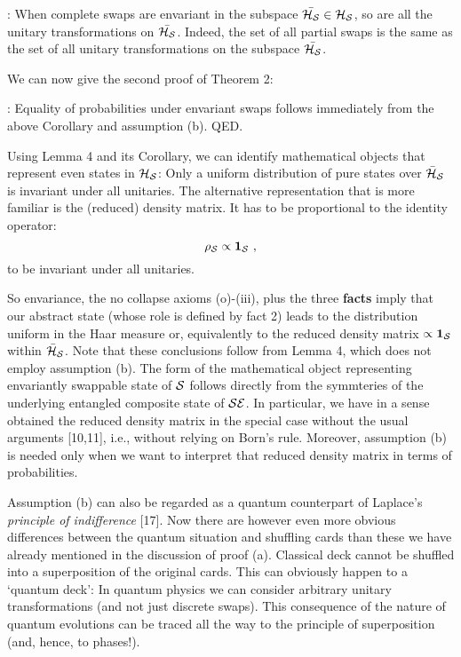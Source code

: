 \documentclass[aps,twocolumn,pra,epsfig]{revtex4}
\begin{document}
: When complete swaps are envariant in the subspace
$\bar {\cal H_S} \in {\cal H_S}$, so are all the unitary transformations on
$\bar {\cal H_S}$. Indeed, the set of all partial swaps is the same
as the set of all unitary transformations on the subspace $\bar {\cal H_S}$.

We can now give the second proof of Theorem 2:

: Equality of probabilities under envariant swaps
follows immediately from the above Corollary and assumption (b). QED.

Using Lemma 4 and its Corollary, we can identify mathematical objects that
represent even states in ${\cal H_S}$: Only a uniform  distribution of pure
states over $\bar {\cal H}_{\cal S}$ is invariant under all unitaries.
The alternative representation that is more familiar is the (reduced)
density matrix. It has to be proportional to the identity operator:
$$ \rho_{\cal S} \propto {\bf 1}_{\cal S} \ , $$
to be invariant under all unitaries.

So envariance, the no collapse axioms (o)-(iii), plus the three {\bf facts}
imply that our abstract state (whose role is defined by fact 2) leads to
the distribution uniform in the Haar measure or, equivalently to the reduced
density matrix $\propto{\bf 1}_{\cal S}$ within $\bar {\cal H}_{\cal S}$. Note
that these conclusions follow from Lemma 4, which does not employ assumption
(b). The form of the mathematical object representing envariantly swappable
state of ${\cal S}$ follows directly from the symmteries of the underlying
entangled composite state of ${\cal SE}$. In particular, we have in a sense
obtained the reduced density matrix in the special case without the usual
arguments [10,11], i.e., without relying on Born's rule. Moreover, assumption
(b) is needed only when we want to interpret that reduced density matrix
in terms of probabilities.

Assumption (b) can also be regarded as a quantum counterpart of
Laplace's {\it principle of indifference} [17]. Now there are however even
more obvious differences between the quantum situation and shuffling cards
than these we have already mentioned in the discussion of proof (a). Classical 
deck cannot be shuffled into a superposition of the original cards. This can 
obviously happen to a `quantum deck': In quantum physics we can 
consider arbitrary unitary transformations (and not just discrete
swaps). This consequence of the nature of quantum evolutions can be traced all
the way to the principle of superposition (and, hence, to phases!).  
\end{document}
